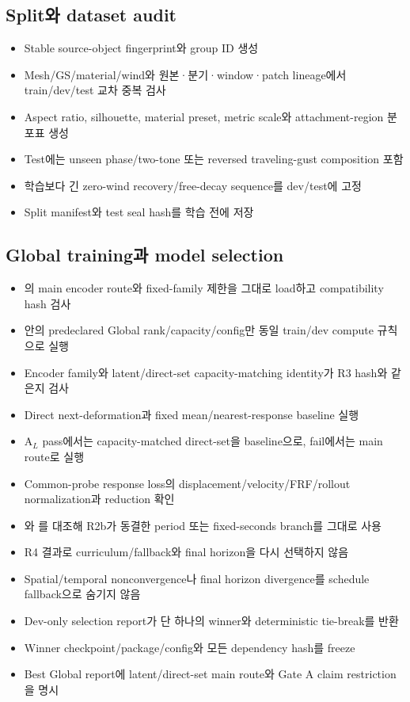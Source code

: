 \documentclass[10pt,a4paper]{article}
\begin{document}
\subsection{Split와 dataset audit}

\begin{itemize}
  \item[$\square$] Stable source-object fingerprint와 group ID 생성
  \item[$\square$] Mesh/GS/material/wind와 원본·분기·window·patch lineage에서 train/dev/test 교차 중복 검사
  \item[$\square$] Aspect ratio, silhouette, material preset, metric scale와 attachment-region 분포표 생성
  \item[$\square$] Test에는 unseen phase/two-tone 또는 reversed traveling-gust composition 포함
  \item[$\square$] 학습보다 긴 zero-wind recovery/free-decay sequence를 dev/test에 고정
  \item[$\square$] Split manifest와 test seal hash를 학습 전에 저장
\end{itemize}

\subsection{Global training과 model selection}

\begin{itemize}
  \item[$\square$] 의 main encoder route와 fixed-family 제한을 그대로 load하고 compatibility hash 검사
  \item[$\square$]  안의 predeclared Global rank/capacity/config만 동일 train/dev compute 규칙으로 실행
  \item[$\square$] Encoder family와 latent/direct-set capacity-matching identity가 R3 hash와 같은지 검사
  \item[$\square$] Direct next-deformation과 fixed mean/nearest-response baseline 실행
  \item[$\square$] A\(_L\) pass에서는 capacity-matched direct-set을 baseline으로, fail에서는 main route로 실행
  \item[$\square$] Common-probe response loss의 displacement/velocity/FRF/rollout normalization과 reduction 확인
  \item[$\square$] 와 를 대조해 R2b가 동결한
  period 또는 fixed-seconds branch를 그대로 사용
  \item[$\square$] R4 결과로 curriculum/fallback와 final horizon을 다시 선택하지 않음
  \item[$\square$] Spatial/temporal nonconvergence나 final horizon divergence를 schedule fallback으로 숨기지 않음
  \item[$\square$] Dev-only selection report가 단 하나의 winner와 deterministic tie-break를 반환
  \item[$\square$] Winner checkpoint/package/config와 모든 dependency hash를 freeze
  \item[$\square$] Best Global report에 latent/direct-set main route와 Gate A claim restriction을 명시
\end{itemize}
\end{document}
